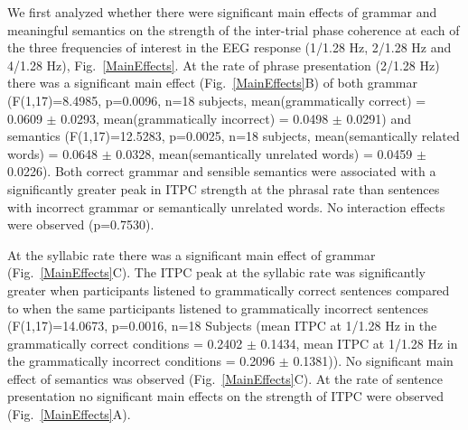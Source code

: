 \documentclass[a4paper,10pt,twoside]{article}
\begin{document}
We first analyzed whether there were significant main effects of grammar and meaningful semantics on the strength of the inter-trial phase coherence at each of the three frequencies of interest in the EEG response (1/1.28 Hz, 2/1.28 Hz and 4/1.28 Hz), Fig.~\ref{MainEffects}. At the rate of phrase presentation (2/1.28 Hz) there was a significant main effect (Fig.~\ref{MainEffects}B) of both grammar (F(1,17)=8.4985, p=0.0096, n=18 subjects, mean(grammatically correct) =  0.0609 $\pm$ 0.0293, mean(grammatically incorrect) = 0.0498 $\pm$ 0.0291) and semantics (F(1,17)=12.5283, p=0.0025, n=18 subjects, mean(semantically related words) = 0.0648 $\pm$ 0.0328, mean(semantically unrelated words) = 0.0459 $\pm$ 0.0226). Both correct grammar and sensible semantics were associated with a significantly greater peak in ITPC strength at the phrasal rate than sentences with incorrect grammar or semantically unrelated words. No interaction effects were observed (p=0.7530).

At the syllabic rate there was a significant main effect of grammar (Fig.~\ref{MainEffects}C). The ITPC peak at the syllabic rate was significantly greater when participants listened to grammatically correct sentences compared to when the same participants listened to grammatically incorrect sentences (F(1,17)=14.0673, p=0.0016, n=18 Subjects (mean ITPC at 1/1.28 Hz in the grammatically correct conditions = 0.2402 $\pm$ 0.1434, mean ITPC at 1/1.28 Hz in the grammatically incorrect conditions = 0.2096 $\pm$ 0.1381)). No significant main effect of semantics was observed (Fig.~\ref{MainEffects}C). At the rate of sentence presentation no significant main effects on the strength of ITPC were observed (Fig.~\ref{MainEffects}A).


\end{document}
